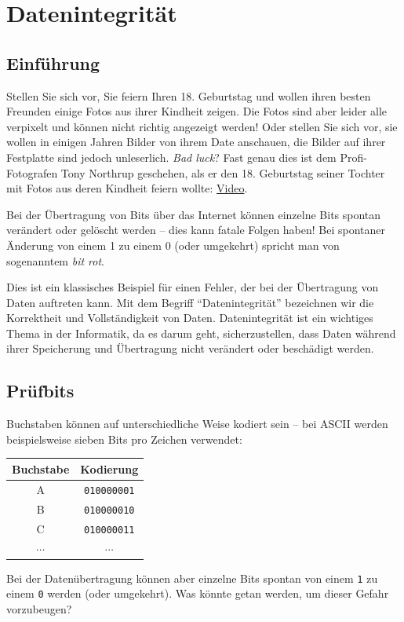 \chapter{Datenintegrität}

\section{Einführung}

Stellen Sie sich vor, Sie feiern Ihren 18. Geburtstag und wollen ihren besten Freunden einige Fotos aus ihrer Kindheit zeigen. Die Fotos sind aber leider alle verpixelt und können nicht richtig angezeigt werden! Oder stellen Sie sich vor, sie wollen in einigen Jahren Bilder von ihrem Date anschauen, die Bilder auf ihrer Festplatte sind jedoch unleserlich. \textit{Bad luck}? Fast genau dies ist dem Profi-Fotografen Tony Northrup geschehen, als er den 18. Geburtstag seiner Tochter mit Fotos aus deren Kindheit feiern wollte: \href{https://www.youtube.com/watch?v=xvbnhCDfREk}{Video}.

Bei der Übertragung von Bits über das Internet können einzelne Bits spontan verändert oder gelöscht werden -- dies kann fatale Folgen haben! Bei spontaner Änderung von einem 1 zu einem 0 (oder umgekehrt) spricht man von sogenanntem \textit{bit rot}.

Dies ist ein klassisches Beispiel für einen Fehler, der bei der Übertragung von Daten auftreten kann. Mit dem Begriff \enquote{Datenintegrität} bezeichnen wir die Korrektheit und Vollständigkeit von Daten. Datenintegrität ist ein wichtiges Thema in der Informatik, da es darum geht, sicherzustellen, dass Daten während ihrer Speicherung und Übertragung nicht verändert oder beschädigt werden.

\section{Prüfbits}

Buchstaben können auf unterschiedliche Weise kodiert sein -- bei \gls{ASCII} werden beispielsweise sieben Bits pro Zeichen verwendet:

\begin{table}[H]
    \centering
    \begin{tabular}{c|c}
        Buchstabe & Kodierung          \\\midrule\midrule
        A         & \texttt{010000001} \\\midrule
        B         & \texttt{010000010} \\\midrule
        C         & \texttt{010000011} \\\midrule
        $\cdots$  & $\cdots$
    \end{tabular}
\end{table}
Bei der Datenübertragung können aber einzelne Bits spontan von einem \texttt{1} zu einem \texttt{0} werden (oder umgekehrt). Was könnte getan werden, um dieser Gefahr vorzubeugen?

